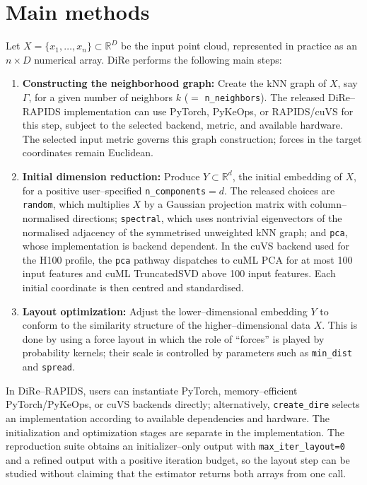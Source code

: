 \documentclass[11pt]{article}
\begin{document}
\section{Main methods}

Let $X = \{x_1,\ldots,x_n\} \subset \mathbb{R}^D$ be the input point cloud, represented in practice as an $n \times D$ numerical array. DiRe performs the following main steps:

\begin{enumerate}
    \item \textbf{Constructing the neighborhood graph:} Create the kNN graph of $X$, say $\Gamma$, for a given number of neighbors $k$ ($=$ \texttt{n\_neighbors}). The released DiRe--RAPIDS implementation can use PyTorch, PyKeOps, or RAPIDS/cuVS for this step, subject to the selected backend, metric, and available hardware. The selected input metric governs this graph construction; forces in the target coordinates remain Euclidean.
    \item \textbf{Initial dimension reduction:} Produce $Y \subset \mathbb{R}^d$, the initial embedding of $X$, for a positive user--specified \texttt{n\_components}$=d$. The released choices are \texttt{random}, which multiplies $X$ by a Gaussian projection matrix with column--normalised directions; \texttt{spectral}, which uses nontrivial eigenvectors of the normalised adjacency of the symmetrised unweighted kNN graph; and \texttt{pca}, whose implementation is backend dependent. In the cuVS backend used for the H100 profile, the \texttt{pca} pathway dispatches to cuML PCA for at most 100 input features and cuML TruncatedSVD above 100 input features. Each initial coordinate is then centred and standardised.
    \item \textbf{Layout optimization:} Adjust the lower--dimensional embedding $Y$ to conform to the similarity structure of the higher--dimensional data $X$. This is done by using a force layout in which the role of ``forces'' is played by probability kernels; their scale is controlled by parameters such as \texttt{min\_dist} and \texttt{spread}.
\end{enumerate}

In DiRe--RAPIDS, users can instantiate PyTorch, memory--efficient PyTorch/PyKeOps, or cuVS backends directly; alternatively, \texttt{create\_dire} selects an implementation according to available dependencies and hardware. The initialization and optimization stages are separate in the implementation. The reproduction suite obtains an initializer--only output with \texttt{max\_iter\_layout=0} and a refined output with a positive iteration budget, so the layout step can be studied without claiming that the estimator returns both arrays from one call.
\end{document}
